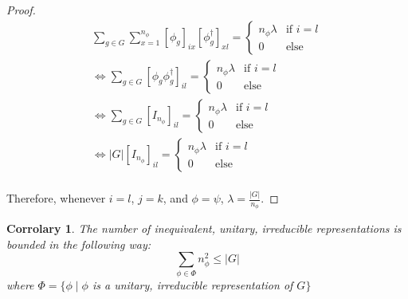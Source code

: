 \documentclass[10pt]{ucthesis}
\newtheorem{corrolary}[definition]{Corrolary}
\begin{document}
\begin{proof}
$$\begin{aligned}
			\sum_{g\in G} \sum_{x=1}^{n_\phi}\left[\phi_g\right]_{ix}\left[\phi^\dag_g\right]_{xl} = \begin{cases}
																			n_\phi\lambda &\text{if } i = l\\
																			0 & \text{else}
																			\end{cases}\\
\Leftrightarrow
			\sum_{g\in G} \left[\phi_g\phi^\dag_g\right]_{il} = \begin{cases}
																			n_\phi\lambda &\text{if } i = l\\
																			0 & \text{else}
																			\end{cases}\\
\Leftrightarrow
			\sum_{g\in G} \left[I_{n_\phi}\right]_{il} = \begin{cases}
																			n_\phi\lambda &\text{if } i = l\\
																			0 & \text{else}
																			\end{cases}\\
\Leftrightarrow
			|G|\left[I_{n_\phi}\right]_{il} = \begin{cases}
																			n_\phi\lambda &\text{if } i = l\\
																			0 & \text{else}
																			\end{cases}\\
\end{aligned}$$ 

Therefore, whenever $i=l$, $j=k$, and $\phi=\psi$, $\lambda = \frac{|G|}{n_\phi}$. \end{proof} 



\begin{corrolary}
	The number of inequivalent, unitary, irreducible representations is bounded in the following way:
$$\sum_{\phi \in \Phi}n^2_\phi \leq |G|$$
where $\Phi = \{\phi \mid \phi$ is a unitary, irreducible representation of $G\}$
\end{corrolary}
\end{document}
